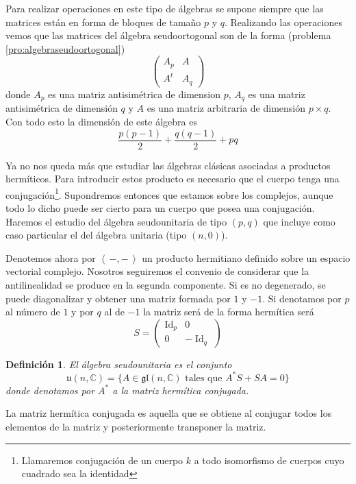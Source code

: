 \documentclass[a4paper,draft,12pt]{article}
\newtheorem{defi}{Definición}[section]%
\newcommand{\C}{\mathbb{C}}%
\newcommand{\escalar}[2]{\left\langle\, #1,#2\, \right\rangle}  %
\newcommand{\df}[1]{\textsf{\color{blue}#1}}
\DeclareMathOperator{\Id}{Id}%
\begin{document}
Para realizar operaciones en este tipo de álgebras se supone siempre que las matrices están en forma de bloques de tamaño $p$ y $q$.  Realizando las operaciones vemos que las matrices del álgebra seudoortogonal son de la forma (problema \ref{pro:algebraseudoortogonal})
$$
\begin{pmatrix}
A_p & A \\
{A}^t& A_q
\end{pmatrix}
$$
donde $A_p$ es una matriz antisimétrica de dimension $p$, $A_q$ es una matriz antisimétrica de dimensión $q$ y $A$ es una matriz arbitraria de dimensión $p\times q$.  Con todo esto la dimensión de este álgebra es 
$$
\frac{p(p-1)}{2}+\frac{q(q-1)}{2}+ pq
$$

\bigskip


Ya no nos queda más que estudiar las álgebras clásicas asociadas a productos hermíticos. Para introducir estos producto es necesario que el cuerpo tenga una conjugación\footnote{Llamaremos  \df{conjugación}  de un cuerpo $k$ a todo isomorfismo de cuerpos cuyo cuadrado sea la identidad}.  Supondremos entonces que estamos sobre los complejos, aunque todo lo dicho puede ser cierto para un cuerpo que posea una conjugación. Haremos el estudio del álgebra seudounitaria de tipo $(p,q)$ que incluye como caso particular el del álgebra unitaria (tipo $(n,0)$).

Denotemos ahora por $\escalar{-}{-}$ un producto hermitiano definido sobre un espacio vectorial complejo. Nosotros seguiremos el convenio de considerar que la antilinealidad se produce en la segunda componente. Si es no degenerado, se puede diagonalizar y obtener una matriz formada por $1$ y $-1$.  Si denotamos por $p$ al número de $1$ y por $q$ al de $-1$ la matriz será de la forma hermítica será
$$
S= \begin{pmatrix}
\Id_p & 0 \\
0 & -\Id_q
\end{pmatrix}
$$



\begin{defi}

El  \df{álgebra seudounitaria}  es el conjunto
$$
\mathfrak{u}(n,\C)= \{ A \in \mathfrak{gl}(n,\C)\text{ tales que } A^*S+SA=0 \}
$$
donde denotamos por $A^*$ a la matriz hermítica conjugada.

\end{defi}

La matriz hermítica conjugada es aquella que se obtiene al conjugar todos los elementos de la matriz y posteriormente transponer la matriz.
\end{document}
